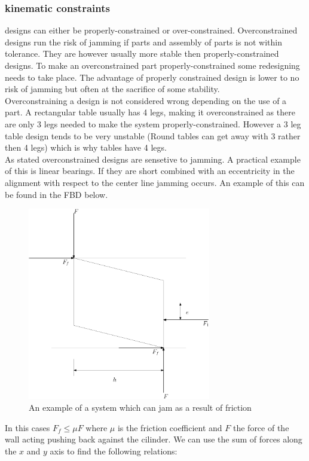 \documentclass[11pt, a4paper]{article}
\numberwithin{equation}{section}
\numberwithin{figure}{section}
\begin{document}
\subsubsection{kinematic constraints}
designs can either be properly-constrained or over-constrained. Overconstrained designs run the risk of jamming if parts and assembly of parts is not within tolerance. They are however usually more stable then properly-constrained designs. To make an overconstrained part properly-constrained some redesigning needs to take place. The advantage of properly constrained design is lower to no risk of jamming but often at the sacrifice of some stability.\\
Overconstraining a design is not considered wrong depending on the use of a part. A  rectangular table usually has 4 legs, making it overconstrained as there are only 3 legs needed to make the system properly-constrained. However a 3 leg table design tends to be very unstable (Round tables can get away with 3 rather then 4 legs) which is why tables have 4 legs.\\
As stated overconstrained designs are sensetive to jamming. A practical example of this is linear bearings. If they are short combined with an eccentricity in the alignment with respect to the center line jamming occurs. An example of this can be found in the FBD below.
\begin{figure}[H]
  \centerline{\includegraphics[width=80mm]{images/FBD_jamming.png}}
  \caption{An example of a system which can jam as a result of friction}
\end{figure}
In this cases $F_f \leq \mu F$ where $\mu$ is the friction coefficient and $F$ the force of the wall acting pushing back against the cilinder. We can use the sum of forces along the $x$ and $y$ axis to find the following relations:
\end{document}
